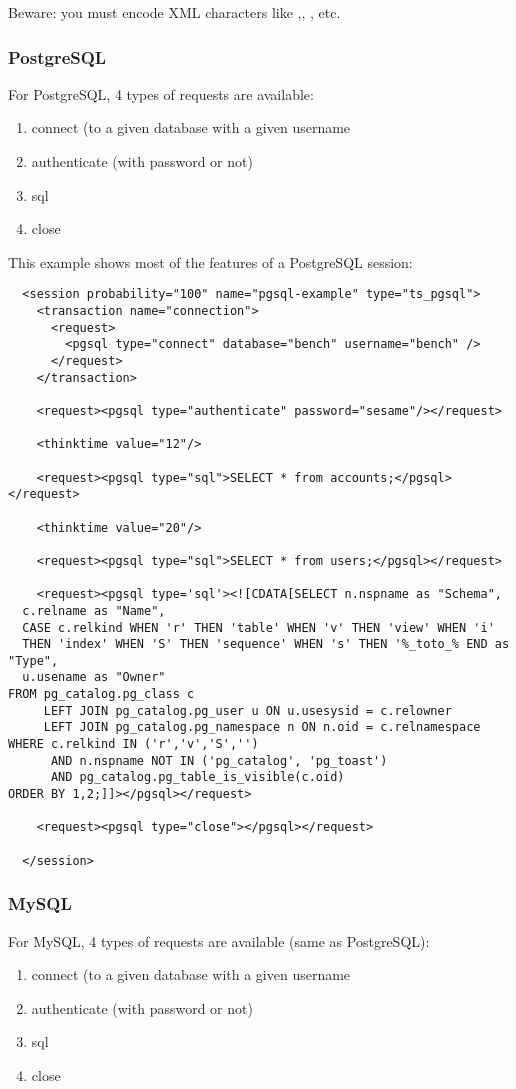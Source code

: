 \documentclass{IDXDOC-en}
\begin{document}
Beware: you must encode XML characters like \userinput{<}
,\userinput{>}, \userinput{\&}, etc.

\subsubsection{PostgreSQL}

For PostgreSQL, 4 types of requests are available:
\begin{enumerate}
\item connect (to a given database with a given username
\item authenticate (with password or not)
\item sql
\item close
\end{enumerate}

This example shows most of the features of a PostgreSQL session:

\begin{Verbatim}
  <session probability="100" name="pgsql-example" type="ts_pgsql">
    <transaction name="connection">
      <request>
        <pgsql type="connect" database="bench" username="bench" />
      </request>
    </transaction>

    <request><pgsql type="authenticate" password="sesame"/></request>

    <thinktime value="12"/>

    <request><pgsql type="sql">SELECT * from accounts;</pgsql></request>

    <thinktime value="20"/>

    <request><pgsql type="sql">SELECT * from users;</pgsql></request>

    <request><pgsql type='sql'><![CDATA[SELECT n.nspname as "Schema",
  c.relname as "Name",
  CASE c.relkind WHEN 'r' THEN 'table' WHEN 'v' THEN 'view' WHEN 'i'
  THEN 'index' WHEN 'S' THEN 'sequence' WHEN 's' THEN '%_toto_% END as "Type",
  u.usename as "Owner"
FROM pg_catalog.pg_class c
     LEFT JOIN pg_catalog.pg_user u ON u.usesysid = c.relowner
     LEFT JOIN pg_catalog.pg_namespace n ON n.oid = c.relnamespace
WHERE c.relkind IN ('r','v','S','')
      AND n.nspname NOT IN ('pg_catalog', 'pg_toast')
      AND pg_catalog.pg_table_is_visible(c.oid)
ORDER BY 1,2;]]></pgsql></request>

    <request><pgsql type="close"></pgsql></request>

  </session>
\end{Verbatim}

\subsubsection{MySQL}
\label{sec:session:mysql}
For MySQL, 4 types of requests are available (same as PostgreSQL):
\begin{enumerate}
\item connect (to a given database with a given username
\item authenticate (with password or not)
\item sql
\item close
\end{enumerate}
\end{document}
